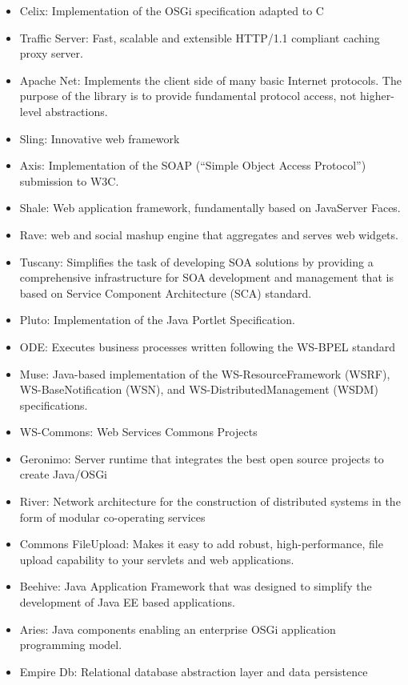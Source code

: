 \documentclass[natbib]{svjour3}
\begin{document}
\begin{itemize}
\item
  Celix: Implementation of the OSGi specification adapted to C
\item
  Traffic Server: Fast, scalable and extensible HTTP/1.1 compliant
  caching proxy server.
\item
  Apache Net: Implements the client side of many basic Internet
  protocols. The purpose of the library is to provide fundamental
  protocol access, not higher-level abstractions.
\item
  Sling: Innovative web framework
\item
  Axis: Implementation of the SOAP (``Simple Object Access Protocol'')
  submission to W3C.
\item
  Shale: Web application framework, fundamentally based on JavaServer
  Faces.
\item
  Rave: web and social mashup engine that aggregates and serves web
  widgets.
\item
  Tuscany: Simplifies the task of developing SOA solutions by providing
  a comprehensive infrastructure for SOA development and management that
  is based on Service Component Architecture (SCA) standard.
\item
  Pluto: Implementation of the Java Portlet Specification.
\item
  ODE: Executes business processes written following the WS-BPEL
  standard
\item
  Muse: Java-based implementation of the WS-ResourceFramework (WSRF),
  WS-BaseNotification (WSN), and WS-DistributedManagement (WSDM)
  specifications.
\item
  WS-Commons: Web Services Commons Projects
\item
  Geronimo: Server runtime that integrates the best open source projects
  to create Java/OSGi
\item
  River: Network architecture for the construction of distributed
  systems in the form of modular co-operating services
\item
  Commons FileUpload: Makes it easy to add robust, high-performance,
  file upload capability to your servlets and web applications.
\item
  Beehive: Java Application Framework that was designed to simplify the
  development of Java EE based applications.
\item
  Aries: Java components enabling an enterprise OSGi application
  programming model.
\item
  Empire Db: Relational database abstraction layer and data persistence

\end{itemize}
\end{document}
